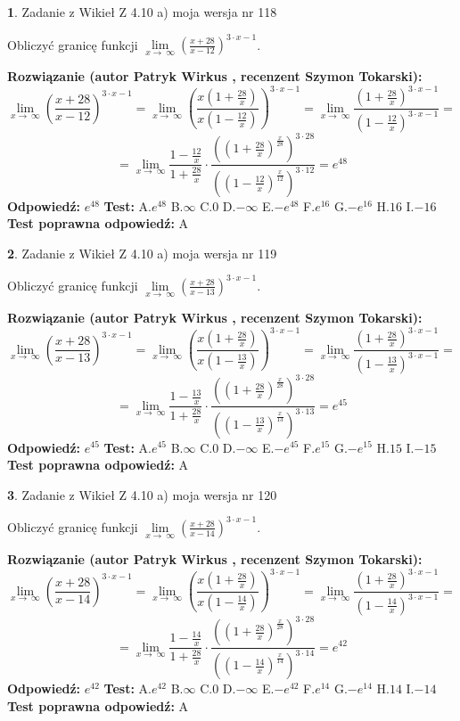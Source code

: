 \documentclass[12pt, a4paper]{article}
\theoremstyle{definition} %
\newtheorem{zad}{}
\newcommand{\zadStart}[1]{\begin{zad}#1\newline}
\newcommand{\zadStop}{\end{zad}}
\newcommand{\rozwStart}[2]{\noindent \textbf{Rozwiązanie (autor #1 , recenzent #2): }\newline}
\newcommand{\rozwStop}{\newline}
\newcommand{\odpStart}{\noindent \textbf{Odpowiedź:}\newline}
\newcommand{\odpStop}{\newline}
\newcommand{\testStart}{\noindent \textbf{Test:}\newline}
\newcommand{\testStop}{\newline}
\newcommand{\kluczStart}{\noindent \textbf{Test poprawna odpowiedź:}\newline}
\newcommand{\kluczStop}{\newline}
\begin{document}
\zadStart{Zadanie z Wikieł Z 4.10 a) moja wersja nr 118}

Obliczyć granicę funkcji  $\lim\limits_{x\to\ \infty}(\frac{x+28}{x-12})^{3\cdot x-1}$.
\zadStop
\rozwStart{Patryk Wirkus}{Szymon Tokarski}
$$\lim\limits_{x\to\ \infty}(\frac{x+28}{x-12})^{3\cdot x-1} = \lim\limits_{x\to\ \infty}(\frac{x(1+\frac{28}{x})}{x(1-\frac{12}{x})})^{3\cdot x-1}=\lim\limits_{x\to\ \infty}\frac{(1+\frac{28}{x})^{3\cdot x-1}}{(1-\frac{12}{x})^{3\cdot x-1}}=$$
$$=\lim\limits_{x\to\ \infty}\frac{1-\frac{12}{x}}{1+\frac{28}{x}}\cdot\frac{((1+\frac{28}{x})^{\frac{x}{28}})^{3\cdot28}}{((1-\frac{12}{x})^{\frac{x}{12}})^{3\cdot12}}=e^{48}$$
\rozwStop
\odpStart
$e^{48}$
\odpStop
\testStart
A.$e^{48}$ B.$\infty$ C.$0$ D.$-\infty$ E.$-e^{48}$
F.$e^{16}$ G.$-e^{16}$
H.$16$
I.$-16$
\testStop
\kluczStart
A
\kluczStop



\zadStart{Zadanie z Wikieł Z 4.10 a) moja wersja nr 119}

Obliczyć granicę funkcji  $\lim\limits_{x\to\ \infty}(\frac{x+28}{x-13})^{3\cdot x-1}$.
\zadStop
\rozwStart{Patryk Wirkus}{Szymon Tokarski}
$$\lim\limits_{x\to\ \infty}(\frac{x+28}{x-13})^{3\cdot x-1} = \lim\limits_{x\to\ \infty}(\frac{x(1+\frac{28}{x})}{x(1-\frac{13}{x})})^{3\cdot x-1}=\lim\limits_{x\to\ \infty}\frac{(1+\frac{28}{x})^{3\cdot x-1}}{(1-\frac{13}{x})^{3\cdot x-1}}=$$
$$=\lim\limits_{x\to\ \infty}\frac{1-\frac{13}{x}}{1+\frac{28}{x}}\cdot\frac{((1+\frac{28}{x})^{\frac{x}{28}})^{3\cdot28}}{((1-\frac{13}{x})^{\frac{x}{13}})^{3\cdot13}}=e^{45}$$
\rozwStop
\odpStart
$e^{45}$
\odpStop
\testStart
A.$e^{45}$ B.$\infty$ C.$0$ D.$-\infty$ E.$-e^{45}$
F.$e^{15}$ G.$-e^{15}$
H.$15$
I.$-15$
\testStop
\kluczStart
A
\kluczStop



\zadStart{Zadanie z Wikieł Z 4.10 a) moja wersja nr 120}

Obliczyć granicę funkcji  $\lim\limits_{x\to\ \infty}(\frac{x+28}{x-14})^{3\cdot x-1}$.
\zadStop
\rozwStart{Patryk Wirkus}{Szymon Tokarski}
$$\lim\limits_{x\to\ \infty}(\frac{x+28}{x-14})^{3\cdot x-1} = \lim\limits_{x\to\ \infty}(\frac{x(1+\frac{28}{x})}{x(1-\frac{14}{x})})^{3\cdot x-1}=\lim\limits_{x\to\ \infty}\frac{(1+\frac{28}{x})^{3\cdot x-1}}{(1-\frac{14}{x})^{3\cdot x-1}}=$$
$$=\lim\limits_{x\to\ \infty}\frac{1-\frac{14}{x}}{1+\frac{28}{x}}\cdot\frac{((1+\frac{28}{x})^{\frac{x}{28}})^{3\cdot28}}{((1-\frac{14}{x})^{\frac{x}{14}})^{3\cdot14}}=e^{42}$$
\rozwStop
\odpStart
$e^{42}$
\odpStop
\testStart
A.$e^{42}$ B.$\infty$ C.$0$ D.$-\infty$ E.$-e^{42}$
F.$e^{14}$ G.$-e^{14}$
H.$14$
I.$-14$
\testStop
\kluczStart
A
\kluczStop
\end{document}
